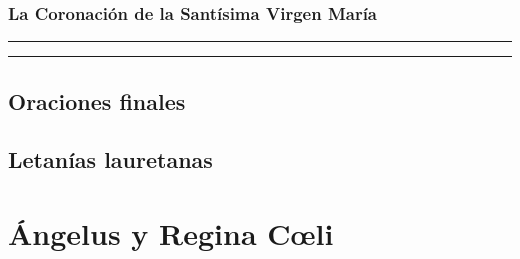 \documentclass[11pt,a4paper]{book}
\begin{document}
    \subsection{La Coronación de la Santísima Virgen María}
    
    
    \rule{\textwidth}{0.5pt}
    
    \rule{\textwidth}{0.5pt}
    

    \section{Oraciones finales}\label{sec:oracion-final}

    

    \section{Letanías lauretanas}
    

    \chapter{Ángelus y Regina Cœli}
    
    
\end{document}
